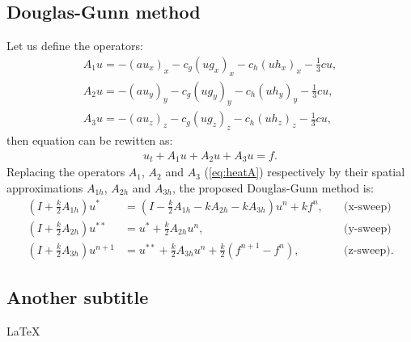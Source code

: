 \documentclass[12pt]{article}
\begin{document}
\subsection{Douglas-Gunn method}
Let us define the operators:
\begin{eqnarray}
A_1u = -(au_x)_x  - c_g(u g_x)_x - c_h(u h_x)_x  - \frac{1}{3}cu, \nonumber \\
A_2u = -(au_y)_y  - c_g(u g_y)_y - c_h(u h_y)_y  - \frac{1}{3}cu, \nonumber \\
A_3u = -(au_z)_z  - c_g(u g_z)_z - c_h(u h_z)_z  - \frac{1}{3}cu, \nonumber
\end{eqnarray}
then equation %
 can be rewitten as:
\begin{eqnarray} 
u_t + A_1u + A_2u  + A_3 u= f. \label{eq:heatA}
\end{eqnarray}
Replacing the operators $A_1$, $A_2$ and $A_3$ (\ref{eq:heatA}) respectively
by their spatial approximations $A_{1h}$, $A_{2h}$ and $A_{3h}$, the proposed Douglas-Gunn method
is:
\begin{align*}
(I+\frac{k}{2}A_{1h})u^* &= (I-\frac{k}{2}A_{1h} - k A_{2h} - k A_{3h})u^n +
k f^{n}, \quad &\text{(x-sweep)}\\
(I+\frac{k}{2}A_{2h})u^{**} &= u^* + \frac{k}{2}A_{2h} u^n , \quad &\text{(y-sweep)}\\
(I + \frac{k}{2} A_{3h})u^{n+1} &= u^{**} + \frac{k}{2}A_{3h} u^n + \frac{k}{2}
(f^{n+1} - f^{n}), \quad &\text{(z-sweep)}.
\end{align*} 

 
\subsection{Another subtitle}

{\LaTeX}
\end{document}
